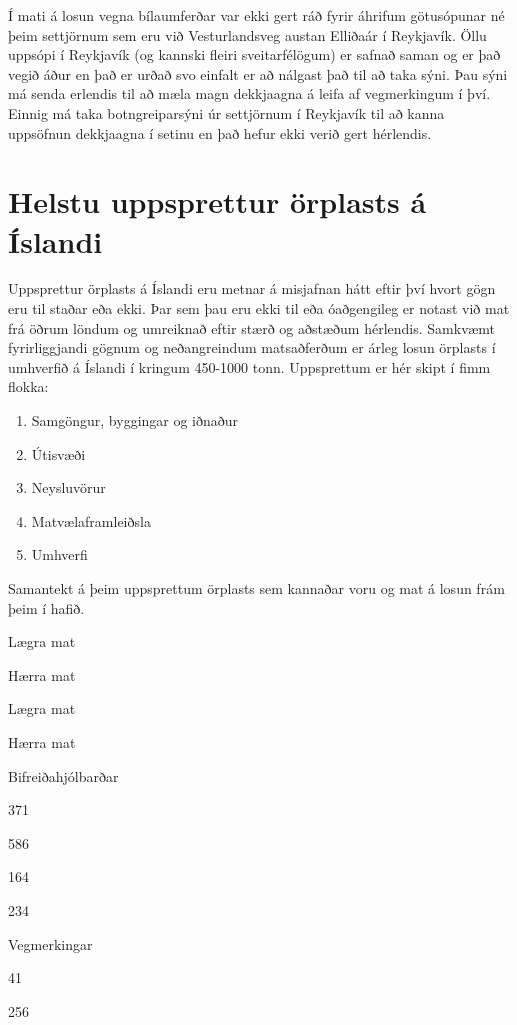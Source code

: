 \documentclass[icelandic,]{book}
\providecommand{\tightlist}{%
  \setlength{\itemsep}{0pt}\setlength{\parskip}{0pt}}
\begin{document}
Í mati á losun vegna bílaumferðar var ekki gert ráð fyrir áhrifum götusópunar né þeim settjörnum sem eru við Vesturlandsveg austan Elliðaár í Reykjavík. Öllu uppsópi í Reykjavík (og kannski fleiri sveitarfélögum) er safnað saman og er það vegið áður en það er urðað svo einfalt er að nálgast það til að taka sýni. Þau sýni má senda erlendis til að mæla magn dekkjaagna á leifa af vegmerkingum í því. Einnig má taka botngreiparsýni úr settjörnum í Reykjavík til að kanna uppsöfnun dekkjaagna í setinu en það hefur ekki verið gert hérlendis.

\hypertarget{helstu-uppsprettur-orplasts-a-islandi}{%
\chapter{Helstu uppsprettur örplasts á Íslandi}\label{helstu-uppsprettur-orplasts-a-islandi}}

Uppsprettur örplasts á Íslandi eru metnar á misjafnan hátt eftir því hvort gögn eru til staðar eða ekki. Þar sem þau eru ekki til eða óaðgengileg er notast við mat frá öðrum löndum og umreiknað eftir stærð og aðstæðum hérlendis. Samkvæmt fyrirliggjandi gögnum og neðangreindum matsaðferðum er árleg losun örplasts í umhverfið á Íslandi í kringum 450-1000 tonn. Uppsprettum er hér skipt í fimm flokka:

\begin{enumerate}
\def\labelenumi{\arabic{enumi}.}
\tightlist
\item
  Samgöngur, byggingar og iðnaður
\item
  Útisvæði
\item
  Neysluvörur
\item
  Matvælaframleiðsla
\item
  Umhverfi
\end{enumerate}

\label{tab:smantekt}Samantekt á þeim uppsprettum örplasts sem kannaðar voru og mat á losun frám þeim í hafið.

Lægra mat

Hærra mat

Lægra mat

Hærra mat

Bifreiðahjólbarðar

371

586

164

234

Vegmerkingar

41

256
\end{document}
